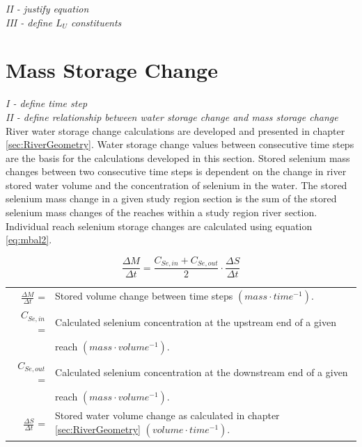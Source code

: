 \begin{linenumbers}
\emph{II - justify equation}\\

\emph{III - define $L_U$ constituents}\\

\clearpage{}
\section{Mass Storage Change}
\label{sec:MassStorageChange}

\emph{I - define time step}\\

\emph{II - define relationship between water storage change and mass storage change}\\

River water storage change calculations are developed and presented in chapter \ref{sec:RiverGeometry}.  Water storage change values between consecutive time steps are the basis for the calculations developed in this section.  Stored selenium mass changes between two consecutive time steps is dependent on the change in river stored water volume and the concentration of selenium in the water.  The stored selenium mass change in a given study region section is the sum of the stored selenium mass changes of the reaches within a study region river section.  Individual reach selenium storage changes are calculated using equation \ref{eq:mbal2}.

\begin{equation}
\frac{\Delta M}{\Delta t}=\frac{C_{Se,in}+C_{Se,out}}{2} \cdot \frac{\Delta S}{\Delta t}
\label{eq:mbal2}
\end{equation}
\begin{tabular}{rl}
$\frac{\Delta M}{\Delta t}$ =&Stored volume change between time steps $(mass \cdot time^{-1})$.\\
$C_{Se,in}$ =& Calculated selenium concentration at the upstream end of a given\\
&reach $(mass \cdot volume^{-1})$.\\
$C_{Se,out}$ =& Calculated selenium concentration at the downstream end of a given\\
&reach $(mass \cdot volume^{-1})$.\\
$\frac{\Delta S}{\Delta t}$ =& Stored water volume change as calculated in chapter \ref{sec:RiverGeometry} $(volume \cdot time^{-1})$.\\
\end{tabular}\\


\end{linenumbers}
